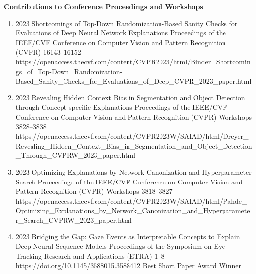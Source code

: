 \headedsection %
{\bf Contributions to Conference Proceedings and Workshops}{}
{
    \begin{enumerate}
        

        \item {}
                            {2023}
                            {Shortcomings of Top-Down Randomization-Based Sanity Checks for Evaluations of Deep Neural Network Explanations}
                            {Proceedings of the IEEE/CVF Conference on Computer Vision and Pattern Recognition (CVPR)}
                            {16143--16152}
                            {https://openaccess.thecvf.com/content/CVPR2023/html/Binder_Shortcomings_of_Top-Down_Randomization-Based_Sanity_Checks_for_Evaluations_of_Deep_CVPR_2023_paper.html}

        \item {}
                            {2023}
                            {Revealing Hidden Context Bias in Segmentation and Object Detection through Concept-specific Explanations}
                            {Proceedings of the IEEE/CVF Conference on Computer Vision and Pattern Recognition (CVPR) Workshops}
                            {3828--3838}
                            {https://openaccess.thecvf.com/content/CVPR2023W/SAIAD/html/Dreyer_Revealing_Hidden_Context_Bias_in_Segmentation_and_Object_Detection_Through_CVPRW_2023_paper.html}

        \item {}
                            {2023}
                            {Optimizing Explanations by Network Canonization and Hyperparameter Search}
                            {Proceedings of the IEEE/CVF Conference on Computer Vision and Pattern Recognition (CVPR) Workshops}
                            {3818--3827}
                            {https://openaccess.thecvf.com/content/CVPR2023W/SAIAD/html/Pahde_Optimizing_Explanations_by_Network_Canonization_and_Hyperparameter_Search_CVPRW_2023_paper.html} 
                            

        \item {}
                            {2023}
                            {Bridging the Gap: Gaze Events as Interpretable Concepts to Explain Deep Neural Sequence Models}
                            {Proceedings of the Symposium on Eye Tracking Research and Applications (ETRA)}
                            {1--8}
                            {https://doi.org/10.1145/3588015.3588412} 
                            {\href{https://datacloud.hhi.fraunhofer.de/s/YExo6qyWDxksRof}{Best Short Paper Award Winner}}


\end{enumerate}}
